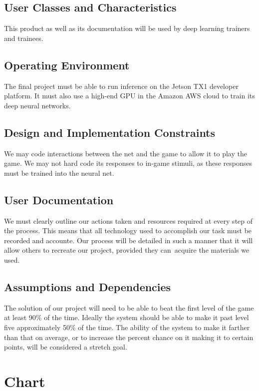 \documentclass{scrreprt}
\begin{document}
\section{User Classes and Characteristics}
This product as well as its documentation will be used by deep learning trainers and trainees.

\section{Operating Environment}
The final project must be able to run inference on the Jetson TX1 developer platform.
It must also use a high-end GPU in the Amazon AWS cloud to train its deep neural networks.

\section{Design and Implementation Constraints}
We may code interactions between the net and the game to allow it to play the game.
We may not hard code its responses to in-game stimuli, as these responses must be trained into the neural net.

\section{User Documentation}
We must clearly outline our actions taken and resources required at every step of the process.
This means that all technology used to accomplish our task must be recorded and accounte.
Our process will be detailed in such a manner that it will allow others to recreate our project, provided they can\
 acquire the materials we used.

\section{Assumptions and Dependencies}
The solution of our project will need to be able to beat the first level of the game at least 90\% of the time.
Ideally the system should be able to make it past level five approximately 50\% of the time.
The ability of the system to make it farther than that on average, or to increase the percent chance on it making it to certain points, will be considered a stretch goal.

\chapter{Chart}
\end{document}
